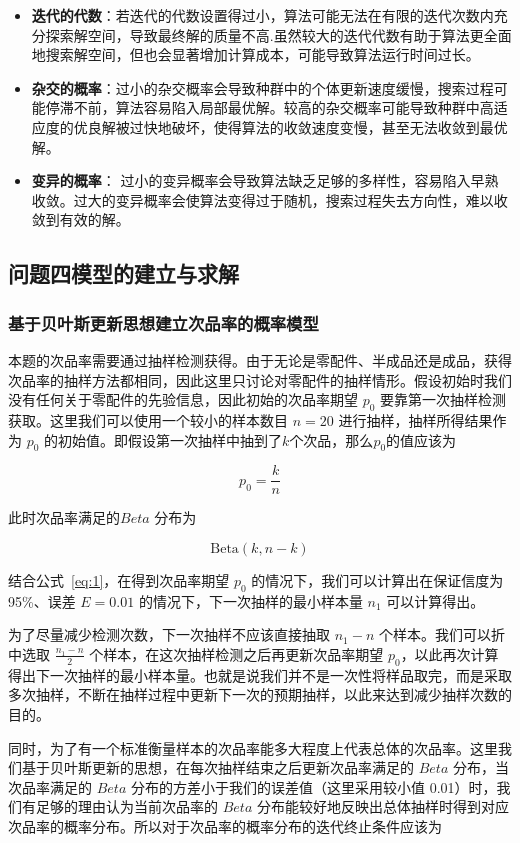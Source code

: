 \documentclass[utf8]{ctexart} %
\begin{document}
		\begin{itemize}  
			\item \textbf{迭代的代数}：若迭代的代数设置得过小，算法可能无法在有限的迭代次数内充分探索解空间，导致最终解的质量不高.虽然较大的迭代代数有助于算法更全面地搜索解空间，但也会显著增加计算成本，可能导致算法运行时间过长。
			\item \textbf{杂交的概率}：过小的杂交概率会导致种群中的个体更新速度缓慢，搜索过程可能停滞不前，算法容易陷入局部最优解。较高的杂交概率可能导致种群中高适应度的优良解被过快地破坏，使得算法的收敛速度变慢，甚至无法收敛到最优解。
			\item \textbf{变异的概率}：  过小的变异概率会导致算法缺乏足够的多样性，容易陷入早熟收敛。过大的变异概率会使算法变得过于随机，搜索过程失去方向性，难以收敛到有效的解。 
		\end{itemize}  
		
	
		\subsection{问题四模型的建立与求解}
		\subsubsection{基于贝叶斯更新思想建立次品率的概率模型}
		本题的次品率需要通过抽样检测获得。由于无论是零配件、半成品还是成品，获得次品率的抽样方法都相同，因此这里只讨论对零配件的抽样情形。假设初始时我们没有任何关于零配件的先验信息，因此初始的次品率期望 $p_0$ 要靠第一次抽样检测获取。这里我们可以使用一个较小的样本数目 $n=20$ 进行抽样，抽样所得结果作为 $p_0$ 的初始值。即假设第一次抽样中抽到了$k$个次品，那么$p_0$的值应该为
		
		
		\[  
		p_0 = \frac{k}{n}  
		\]

		此时次品率满足的$Beta$ 分布为
		
		\[  
		\text{Beta}(k, n-k)  
		\]
		
		结合公式~\eqref{eq:1}，在得到次品率期望 $p_0$ 的情况下，我们可以计算出在保证信度为 95\%、误差 $E=0.01$ 的情况下，下一次抽样的最小样本量 $n_1$ 可以计算得出。
		
		为了尽量减少检测次数，下一次抽样不应该直接抽取 $n_1 - n$ 个样本。我们可以折中选取 $\frac{n_1 - n}{2}$ 个样本，在这次抽样检测之后再更新次品率期望 $p_0$，以此再次计算得出下一次抽样的最小样本量。也就是说我们并不是一次性将样品取完，而是采取多次抽样，不断在抽样过程中更新下一次的预期抽样，以此来达到减少抽样次数的目的。
		
		同时，为了有一个标准衡量样本的次品率能多大程度上代表总体的次品率。这里我们基于贝叶斯更新的思想，在每次抽样结束之后更新次品率满足的 $Beta$ 分布，当次品率满足的 $Beta$  分布的方差小于我们的误差值（这里采用较小值 0.01）时，我们有足够的理由认为当前次品率的 $Beta$ 分布能较好地反映出总体抽样时得到对应次品率的概率分布。所以对于次品率的概率分布的迭代终止条件应该为
		
\end{document}
